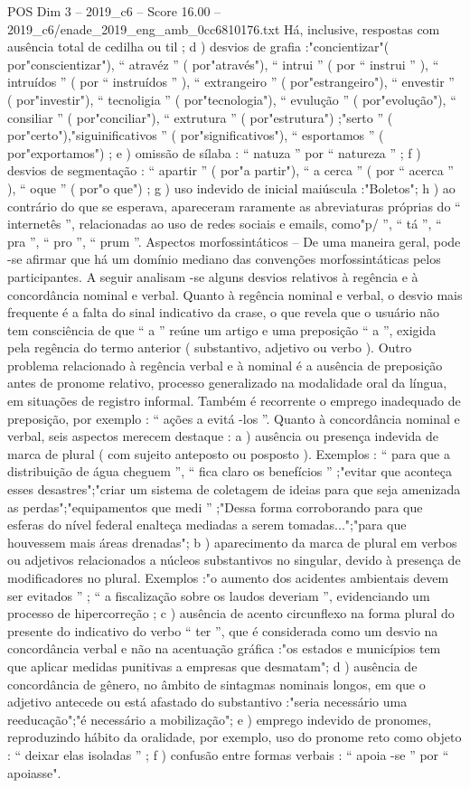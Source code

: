 \begin{textsample}{POS Dim 3 – 2019\_c6 – Score 16.00 – 2019\_c6/enade\_2019\_eng\_amb\_0cc6810176.txt}
Há, inclusive, respostas com ausência total de cedilha ou til ; d ) desvios de grafia :"concientizar"( por"conscientizar"), “ atravéz ” ( por"através"), “ intrui ” ( por “ instrui ” ), “ intruídos ” ( por “ instruídos ” ), “ extrangeiro ” ( por"estrangeiro"), “ envestir ” ( por"investir"), “ tecnoligia ” ( por"tecnologia"), “ evulução ” ( por"evolução"), “ consiliar ” ( por"conciliar"), “ extrutura ” ( por"estrutura") ;"serto ” ( por"certo"),"siguinificativos ” ( por"significativos"), “ esportamos ” ( por"exportamos") ; e ) omissão de sílaba : “ natuza ” por “ natureza ” ; f ) desvios de segmentação : “ apartir ” ( por"a partir"), “ a cerca ” ( por “ acerca ” ), “ oque ” ( por"o que") ; g ) uso indevido de inicial maiúscula :"Boletos"; h ) ao contrário do que se esperava, apareceram raramente as abreviaturas próprias do “ internetês ”, relacionadas ao uso de redes sociais e emails, como"p/ ”, “ tá ”, “ pra ”, “ pro ”, “ prum ”.
Aspectos morfossintáticos – De uma maneira geral, pode -se afirmar que há um domínio mediano das convenções morfossintáticas pelos participantes.
A seguir analisam -se alguns desvios relativos à regência e à concordância nominal e verbal.
Quanto à regência nominal e verbal, o desvio mais frequente é a falta do sinal indicativo da crase, o que revela que o usuário não tem consciência de que “ a ” reúne um artigo e uma preposição “ a ”, exigida pela regência do termo anterior ( substantivo, adjetivo ou verbo ).
Outro problema relacionado à regência verbal e à nominal é a ausência de preposição antes de pronome relativo, processo generalizado na modalidade oral da língua, em situações de registro informal.
Também é recorrente o emprego inadequado de preposição, por exemplo : “ ações a evitá -los ”.
Quanto à concordância nominal e verbal, seis aspectos merecem destaque : a ) ausência ou presença indevida de marca de plural ( com sujeito anteposto ou posposto ).
Exemplos : “ para que a distribuição de água cheguem ”, “ fica claro os benefícios ” ;"evitar que aconteça esses desastres";"criar um sistema de coletagem de ideias para que seja amenizada as perdas";"equipamentos que medi ” ;"Dessa forma corroborando para que esferas do nível federal enalteça mediadas a serem tomadas...";"para que houvessem mais áreas drenadas"; b ) aparecimento da marca de plural em verbos ou adjetivos relacionados a núcleos substantivos no singular, devido à presença de modificadores no plural.
Exemplos :"o aumento dos acidentes ambientais devem ser evitados ” ; “ a fiscalização sobre os laudos deveriam ”, evidenciando um processo de hipercorreção ; c ) ausência de acento circunflexo na forma plural do presente do indicativo do verbo “ ter ”, que é considerada como um desvio na concordância verbal e não na acentuação gráfica :"os estados e municípios tem que aplicar medidas punitivas a empresas que desmatam"; d ) ausência de concordância de gênero, no âmbito de sintagmas nominais longos, em que o adjetivo antecede ou está afastado do substantivo :"seria necessário uma reeducação";"é necessário a mobilização"; e ) emprego indevido de pronomes, reproduzindo hábito da oralidade, por exemplo, uso do pronome reto como objeto : “ deixar elas isoladas ” ; f ) confusão entre formas verbais : “ apoia -se ” por “ apoiasse".

\end{textsample}
